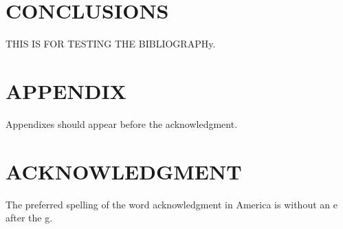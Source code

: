 \documentclass[letterpaper, 10 pt, conference]{ieeeconf}  %
\begin{document}
\section{CONCLUSIONS}

THIS IS FOR TESTING THE BIBLIOGRAPHy. \cite{CALAFIORE2020361}

\addtolength{\textheight}{-12cm}   %







\section*{APPENDIX}

Appendixes should appear before the acknowledgment.

\section*{ACKNOWLEDGMENT}

The preferred spelling of the word acknowledgment in America is without an e after the g.




\end{document}
